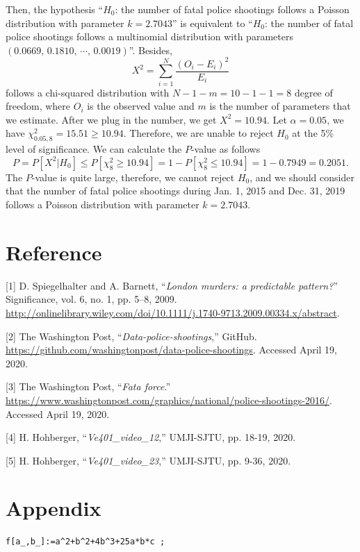 \documentclass[a4paper]{article}
\begin{document}
	Then, the hypothesis “$H_0$: the number of fatal police shootings follows a Poisson distribution with parameter $k=2.7043$” is equivalent to “$H_0$: the number of fatal police shootings follows a multinomial distribution with parameters $(0.0669,\, 0.1810,\,\cdots,\,0.0019)$”. Besides, $$X^2=\sum_{i=1}^N\frac{(O_i-E_i)^2}{E_i}$$ follows a chi-squared distribution with $N-1-m=10-1-1=8$ degree of freedom, where $O_i$ is the observed value and $m$ is the number of parameters that we estimate. After we plug in the number, we get $X^2=10.94$. Let $\alpha=0.05$, we have $\chi_{0.05,8}^2=15.51\ge10.94$. Therefore, we are unable to reject $H_0$ at the 5\% level of significance. We can calculate the $P$-value as follows $$P=P[X^2|H_0]\le P[\chi_8^2\ge10.94]=1-P[\chi_8^2\le10.94]=1-0.7949=0.2051.$$The $P$-value is quite large, therefore, we cannot reject $H_0$, and we should consider that the number of fatal police shootings during Jan. 1, 2015 and Dec. 31, 2019 follows a Poisson distribution with parameter $k=2.7043$.

\section{}











\section{Reference}
[1] D. Spiegelhalter and A. Barnett, “\textit{London murders: a predictable pattern?}” Significance, vol. 6, no. 1, pp. 5–8, 2009. \url{http://onlinelibrary.wiley.com/doi/10.1111/j.1740-9713.2009.00334.x/abstract}.

[2] The Washington Post, “\textit{Data-police-shootings},” GitHub. \url{https://github.com/washingtonpost/data-police-shootings}. Accessed April 19, 2020.

[3] The Washington Post, “\textit{Fata force}.” \url{https://www.washingtonpost.com/graphics/national/police-shootings-2016/}. Accessed April 19, 2020.

[4] H. Hohberger, “\textit{Ve401\_video\_12},” UMJI-SJTU, pp. 18-19, 2020.

[5] H. Hohberger, “\textit{Ve401\_video\_23},” UMJI-SJTU, pp. 9-36, 2020.

\newpage

\section{Appendix}
\begin{lstlisting}
f[a_,b_]:=a^2+b^2+4b^3+25a*b*c ;
\end{lstlisting}
\end{document}
